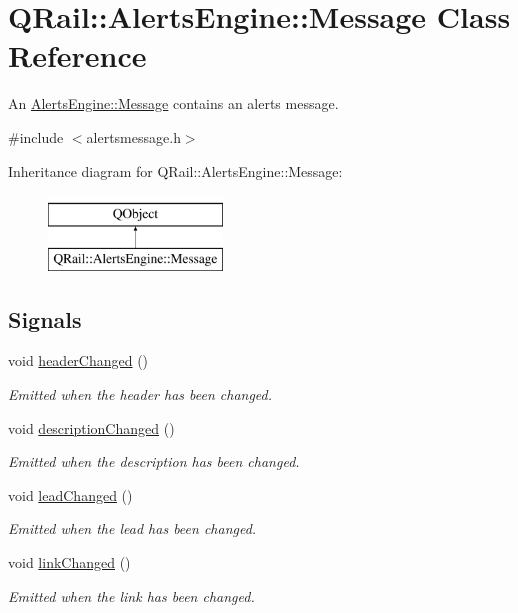\hypertarget{classQRail_1_1AlertsEngine_1_1Message}{}\section{Q\+Rail\+::Alerts\+Engine\+::Message Class Reference}
\label{classQRail_1_1AlertsEngine_1_1Message}


An \mbox{\hyperlink{classQRail_1_1AlertsEngine_1_1Message}{Alerts\+Engine\+::\+Message}} contains an alerts message.  




{\ttfamily \#include $<$alertsmessage.\+h$>$}

Inheritance diagram for Q\+Rail\+::Alerts\+Engine\+::Message\+:\begin{figure}[H]
\begin{center}
\leavevmode
\includegraphics[height=2.000000cm]{classQRail_1_1AlertsEngine_1_1Message}
\end{center}
\end{figure}
\subsection*{Signals}
\begin{DoxyCompactItemize}
\item 
void \mbox{\hyperlink{classQRail_1_1AlertsEngine_1_1Message_a682685d984964fe4f0bc6048fd11206d}{header\+Changed}} ()
\begin{DoxyCompactList}\small\item\em Emitted when the header has been changed. \end{DoxyCompactList}\item 
void \mbox{\hyperlink{classQRail_1_1AlertsEngine_1_1Message_a2558eb50cea5ae890fc68628e54ad9a0}{description\+Changed}} ()
\begin{DoxyCompactList}\small\item\em Emitted when the description has been changed. \end{DoxyCompactList}\item 
void \mbox{\hyperlink{classQRail_1_1AlertsEngine_1_1Message_a119795fc0c8d4c3b6d041844b83cf5ab}{lead\+Changed}} ()
\begin{DoxyCompactList}\small\item\em Emitted when the lead has been changed. \end{DoxyCompactList}\item 
void \mbox{\hyperlink{classQRail_1_1AlertsEngine_1_1Message_afccc9835aa7a6ec718a23cb5f8fbc73d}{link\+Changed}} ()
\begin{DoxyCompactList}\small\item\em Emitted when the link has been changed. \end{DoxyCompactList}\end{DoxyCompactItemize}
